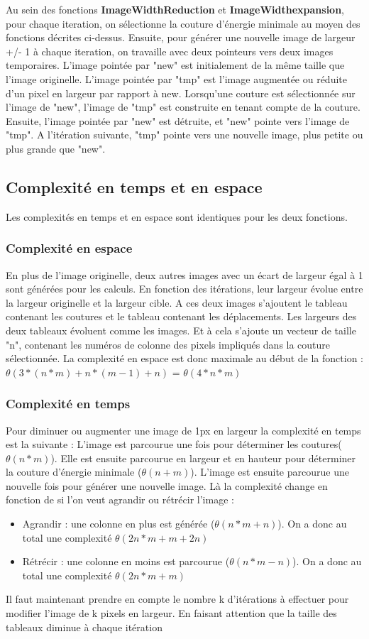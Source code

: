 \documentclass[10pt]{article}
\begin{document}
Au sein des fonctions \textbf{ImageWidthReduction} et \textbf{ImageWidthexpansion}, pour chaque iteration, on sélectionne la couture d'énergie minimale au moyen des fonctions décrites ci-dessus. Ensuite, pour générer une nouvelle image de largeur +/- 1 à chaque iteration, on travaille avec deux pointeurs vers deux images temporaires. L'image pointée par "new" est initialement de la même taille que l'image originelle. L'image pointée par "tmp" est l'image augmentée ou réduite d'un pixel en largeur par rapport à new. Lorsqu'une couture est sélectionnée sur l'image de "new", l'image de "tmp" est construite en tenant compte de la couture. Ensuite, l'image pointée par "new" est détruite, et "new" pointe vers l'image de "tmp". A l'itération suivante, "tmp" pointe vers une nouvelle image, plus petite ou plus grande que "new".

\subsection{Complexité en temps et en espace}
Les complexités en temps et en espace sont identiques pour les deux fonctions.
\subsubsection{Complexité en espace}
	En plus de l'image originelle, deux autres images avec un écart de largeur égal à 1 sont générées pour les calculs. En fonction des itérations, leur largeur évolue entre la largeur originelle et la largeur cible. A ces deux images s'ajoutent le tableau contenant les coutures et le tableau contenant les déplacements. Les largeurs des deux tableaux évoluent comme les images. Et à cela s'ajoute un vecteur de taille "n", contenant les numéros de colonne des pixels impliqués dans la couture sélectionnée.
	La complexité en espace est donc maximale au début de la fonction : $\theta(3*(n*m) + n*(m-1) + n)$ = $\theta(4*n*m)$
\subsubsection{Complexité en temps}
	Pour diminuer ou augmenter une image de 1px en largeur la complexité en temps est la suivante :
L'image est parcourue une fois pour déterminer les coutures($\theta(n*m)$). Elle est ensuite parcourue en largeur et en hauteur pour déterminer la couture d'énergie minimale ($\theta(n+m)$). L'image est ensuite parcourue une nouvelle fois pour générer une nouvelle image. Là la complexité change en fonction de si l'on veut agrandir ou rétrécir l'image :
\begin{itemize}
 \item Agrandir : une colonne en plus est générée ($\theta(n*m + n)$). On a donc au total une complexité $\theta(2n*m + m + 2n)$
 \item Rétrécir : une colonne en moins est parcourue ($\theta(n*m - n)$). On a donc au total une complexité $\theta(2n*m + m)$
 \end{itemize}
 Il faut maintenant prendre en compte le nombre k d'itérations à effectuer pour modifier l'image de k pixels en largeur. En faisant attention que la taille des tableaux diminue à chaque itération
 
\end{document}
